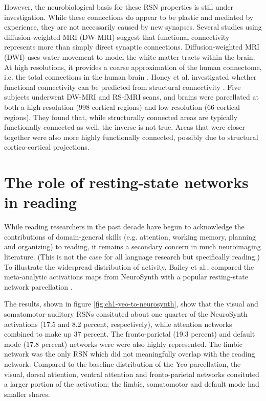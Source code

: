 However, the neurobiological basis for these RSN properties is still under investigation. While these connections do appear to be plastic and mediated by experience, they are not necessarily caused by new synapses. Several studies using diffusion-weighted MRI (DW-MRI) suggest that functional connectivity represents more than simply direct synaptic connections. Diffusion-weighted MRI (DWI) uses water movement to model the white matter tracts within the brain. At high resolutions, it provides a coarse approximation of the human connectome, i.e. the total connections in the human brain \citep{Sporns2005}. Honey et al. investigated whether functional connectivity can be predicted from structural connectivity \citep{Honey2009}. Five subjects underwent DW-MRI and RS-fMRI scans, and brains were parcellated at both a high resolution (998 cortical regions) and low resolution (66 cortical regions). They found that, while structurally connected areas are typically functionally connected as well, the inverse is not true. Areas that were closer together were also more highly functionally connected, possibly due to structural cortico-cortical projections. 

\section{The role of resting-state networks in reading}
While reading researchers in the past decade have begun to acknowledge the contributions of domain-general skills (e.g. attention, working memory, planning and organizing) to reading, it remains a secondary concern in much neuroimaging literature. (This is not the case for all language research but specifically reading.) To illustrate the widespread distribution of activity, Bailey et al., compared the meta-analytic activations maps from NeuroSynth with a popular resting-state network parcellation \citep{Bailey2018}. 

The results, shown in figure \ref{fig:ch1-yeo-to-neurosynth}, show that the visual and somatomotor-auditory RSNs consituted about one quarter of the NeuroSynth activations (17.5 and 8.2 percent, respectively), while attention networks combined to make up 37 percent. The fronto-parietal (19.3 percent) and default mode (17.8 percent) networks were were also highly represented. The limbic network was the only RSN which did not meaningfully overlap with the reading network. Compared to the baseline distribution of the Yeo parcellation, the visual, dorsal attention, ventral attention and fronto-parietal networks consituted a larger portion of the activation; the limbic, somatomotor and default mode had smaller shares. 

